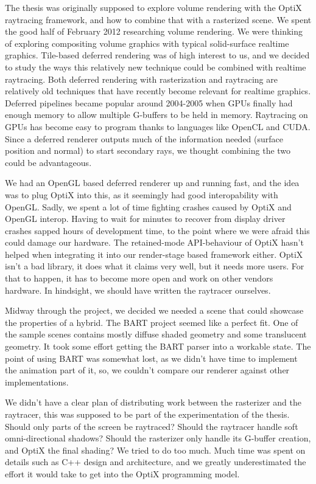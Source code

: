 The thesis was originally supposed to explore volume rendering with the OptiX raytracing framework, and how to combine that with a rasterized scene. We spent the good half of February 2012 researching volume rendering. We were thinking of exploring compositing volume graphics with typical solid-surface realtime graphics. Tile-based deferred rendering was of high interest to us, and we decided to study the ways this relatively new technique could be combined with realtime raytracing. Both deferred rendering with rasterization and raytracing are relatively old techniques that have recently become relevant for realtime graphics. Deferred pipelines became popular around 2004-2005 when GPUs finally had enough memory to allow multiple G-buffers to be held in memory. Raytracing on GPUs has become easy to program thanks to languages like OpenCL and CUDA. Since a deferred renderer outputs much of the information needed (surface position and normal) to start secondary rays, we thought combining the two could be advantageous.

We had an OpenGL based deferred renderer up and running fast, and the idea was to plug OptiX into this, as it seemingly had good interopability with OpenGL. Sadly, we spent a lot of time fighting crashes caused by OptiX and OpenGL interop. Having to wait for minutes to recover from display driver crashes sapped hours of development time, to the point where we were afraid this could damage our hardware. The retained-mode API-behaviour of OptiX hasn't helped when integrating it into our render-stage based framework either. OptiX isn't a bad library, it does what it claims very well, but it needs more users. For that to happen, it has to become more open and work on other vendors hardware. In hindsight, we should have written the raytracer ourselves.

Midway through the project, we decided we needed a scene that could showcase the properties of a hybrid. The BART project seemed like a perfect fit. One of the sample scenes contains mostly diffuse shaded geometry and some translucent geometry. It took some effort getting the BART parser into a workable state. The point of using BART was somewhat lost, as we didn't have time to implement the animation part of it, so, we couldn't compare our renderer against other implementations.

We didn't have a clear plan of distributing work between the rasterizer and the raytracer, this was supposed to be part of the experimentation of the thesis. Should only parts of the screen be raytraced? Should the raytracer handle soft omni-directional shadows? Should the rasterizer only handle its G-buffer creation, and OptiX the final shading? We tried to do too much. Much time was spent on details such as C++ design and architecture, and we greatly underestimated the effort it would take to get into the OptiX programming model.

